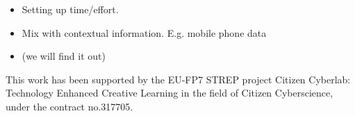 \documentclass{article}
\begin{document}
\begin{itemize}
\item Setting up time/effort. 
\item Mix with contextual information. E.g. mobile phone data 
\item (we will find it out)
\end{itemize}


\begin{acknowledgments}
This work has been supported by the EU-FP7 STREP project Citizen Cyberlab:
Technology Enhanced Creative Learning in the field of Citizen Cyberscience, under the contract no.317705.
\end{acknowledgments}



\end{document}
